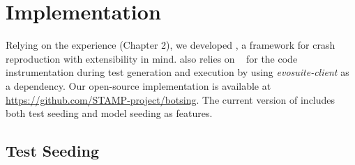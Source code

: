 
\section{Implementation}\label{sec:model_seeding:implementation}



Relying on the \evocrash experience (Chapter 2),  we developed \botsing, a framework for crash reproduction with extensibility in mind.
 \botsing also relies on \evosuite~\cite{Fraser2011} for the code instrumentation during test generation and execution by using \textit{evosuite-client} as a dependency.
Our open-source implementation is available at \url{https://github.com/STAMP-project/botsing}. The current version of \botsing includes both test seeding and model seeding as features.



\subsection{Test Seeding}

